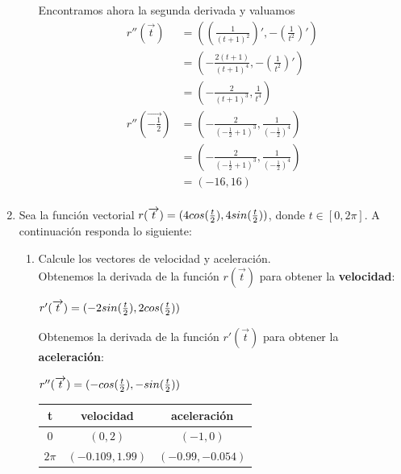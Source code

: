 \documentclass[10pt,letterpaper,fleqn]{article}
\begin{document}
\begin{enumerate}
\begin{itemize}
        	Encontramos ahora la segunda derivada y valuamos
        	\begin{equation*}
        	\begin{split}
        		r''(\overrightarrow{t}) &= \left(\left(\frac{1}{(t+1)^2}\right)',-\left(\frac{1}{t^2}\right)'\right) \\
        								&= \left(-\frac{2(t+1)}{(t+1)^4},-\left(\frac{1}{t^2}\right)'\right) \\
        								&= \left(-\frac{2}{(t+1)^3},\frac{1}{t^4}\right) \\
        		r''(\overrightarrow{-\frac{1}{2}}) &= \left(-\frac{2}{(-\frac{1}{2}+1)^3},\frac{1}{(-\frac{1}{2})^4}\right) \\
        								&= \left(-\frac{2}{(-\frac{1}{2}+1)^3},\frac{1}{(-\frac{1}{2})^4}\right) \\
        								&= \left(-16,16\right) \\
        	\end{split}
        	\end{equation*}


        \end{itemize}

        \item Sea la función vectorial $r (\overrightarrow{t}) = (4cos({t \over 2}),4sin({t \over 2}))$, donde $t \in [0,2\pi]$. A continuación responda lo siguiente:
        \begin{enumerate}
            \item Calcule los vectores de velocidad y aceleración.
            \\ Obtenemos la derivada de la función  $r (\overrightarrow{t})$ para obtener la {\bf velocidad}: 
            \begin{center}
                $r'(\overrightarrow{t}) = (-2sin({t \over 2}),2cos({t \over 2}))$ 
            \end{center}

            Obtenemos la derivada de la función $r'(\overrightarrow{t})$ para obtener la {\bf aceleración}:
            \begin{center}
                $r''(\overrightarrow{t}) = (-cos({t \over 2}),-sin({t \over 2}))$ \\
                \begin{tabular}{|c|c|c|} \hline 
                    t & velocidad & aceleración \\ \hline
                    $0$ & $(0,2) $ & $(-1,0)$  \\ \hline
                    $2\pi$ & $(-0.109,1.99)$ & $(-0.99,-0.054)$  \\ \hline
                \end{tabular}
            \end{center}


\end{enumerate}
\end{enumerate}
\end{document}
